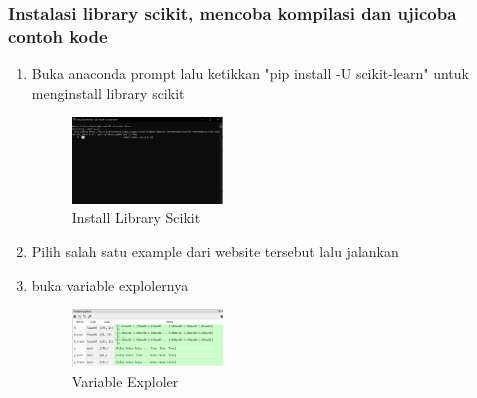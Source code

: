             \subsubsection{Instalasi library scikit, mencoba kompilasi dan ujicoba contoh kode}
            \begin{enumerate}
                \item Buka anaconda prompt lalu ketikkan "pip install -U scikit-learn" untuk menginstall library scikit
                \begin{figure}[H]
                    \includegraphics[width=4cm]{figures/1174040/chap1/1.png}
                    \centering
                    \caption{Install Library Scikit}
                \end{figure}
                \item Pilih salah satu example dari website tersebut lalu jalankan \hfill \break 
                
                \item buka variable explolernya
                \begin{figure}[H]
                    \includegraphics[width=4cm]{figures/1174040/chap1/2.png}
                    \centering
                    \caption{Variable Exploler}
                \end{figure}
            \end{enumerate}

